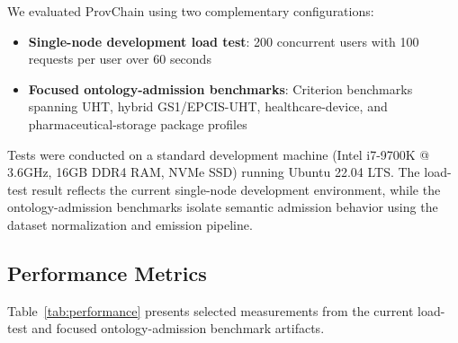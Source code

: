 \documentclass[preprint,review,12pt,authoryear]{elsarticle}
\begin{document}
We evaluated ProvChain using two complementary configurations:
\begin{itemize}
    \item \textbf{Single-node development load test}: 200 concurrent users with 100 requests per user over 60 seconds
    \item \textbf{Focused ontology-admission benchmarks}: Criterion benchmarks spanning UHT, hybrid GS1/EPCIS-UHT, healthcare-device, and pharmaceutical-storage package profiles
\end{itemize}

Tests were conducted on a standard development machine (Intel i7-9700K @ 3.6GHz, 16GB DDR4 RAM, NVMe SSD) running Ubuntu 22.04 LTS. The load-test result reflects the current single-node development environment, while the ontology-admission benchmarks isolate semantic admission behavior using the dataset normalization and emission pipeline.

\subsection{Performance Metrics}

Table~\ref{tab:performance} presents selected measurements from the current load-test and focused ontology-admission benchmark artifacts.

\begin{table}[htbp]
\centering
\caption{Selected Performance Results from the Current Evaluation Artifacts}
\label{tab:performance}
\end{table}
\end{document}
